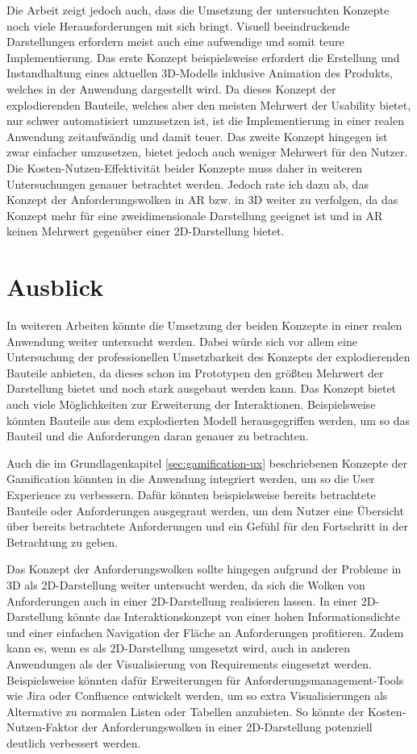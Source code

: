 Die Arbeit zeigt jedoch auch, dass die Umsetzung der untersuchten Konzepte noch viele Herausforderungen mit sich bringt.
Visuell beeindruckende Darstellungen erfordern meist auch eine aufwendige und somit teure Implementierung.
Das erste Konzept beispielsweise erfordert die Erstellung und Instandhaltung eines aktuellen 3D-Modells inklusive Animation des Produkts, welches in der Anwendung dargestellt wird.
Da dieses Konzept der explodierenden Bauteile, welches aber den meisten Mehrwert der Usability bietet, nur schwer automatisiert umzusetzen ist, ist die Implementierung in einer realen Anwendung zeitaufwändig und damit teuer.
Das zweite Konzept hingegen ist zwar einfacher umzusetzen, bietet jedoch auch weniger Mehrwert für den Nutzer.
Die Kosten-Nutzen-Effektivität beider Konzepte muss daher in weiteren Untersuchungen genauer betrachtet werden.
Jedoch rate ich dazu ab, das Konzept der Anforderungswolken in AR bzw. in 3D weiter zu verfolgen, da das Konzept mehr für eine zweidimensionale Darstellung geeignet ist und in AR keinen Mehrwert gegenüber einer 2D-Darstellung bietet.

\section{Ausblick}
\label{section:ausblick}

In weiteren Arbeiten könnte die Umsetzung der beiden Konzepte in einer realen Anwendung weiter untersucht werden.
Dabei würde sich vor allem eine Untersuchung der professionellen Umsetzbarkeit des Konzepts der explodierenden Bauteile anbieten, da dieses schon im Prototypen den größten Mehrwert der Darstellung bietet und noch stark ausgebaut werden kann.
Das Konzept bietet auch viele Möglichkeiten zur Erweiterung der Interaktionen.
Beispielsweise könnten Bauteile aus dem explodierten Modell herausgegriffen werden, um so das Bauteil und die Anforderungen daran genauer zu betrachten.

Auch die im Grundlagenkapitel \ref{sec:gamification-ux} beschriebenen Konzepte der Gamification könnten in die Anwendung integriert werden, um so die User Experience zu verbessern.
Dafür könnten beispielsweise bereits betrachtete Bauteile oder Anforderungen ausgegraut werden, um dem Nutzer eine Übersicht über bereits betrachtete Anforderungen und ein Gefühl für den \glqq{}Fortschritt\grqq{} in der Betrachtung zu geben.

Das Konzept der Anforderungswolken sollte hingegen aufgrund der Probleme in 3D als 2D-Darstellung weiter untersucht werden, da sich die Wolken von Anforderungen auch in einer 2D-Darstellung realisieren lassen.
In einer 2D-Darstellung könnte das Interaktionskonzept von einer hohen Informationsdichte und einer einfachen Navigation der Fläche an Anforderungen profitieren.
Zudem kann es, wenn es als 2D-Darstellung umgesetzt wird, auch in anderen Anwendungen als der Visualisierung von Requirements eingesetzt werden.
Beispielsweise könnten dafür Erweiterungen für Anforderungsmanagement-Tools wie Jira oder Confluence entwickelt werden, um so extra Visualisierungen als Alternative zu normalen Listen oder Tabellen anzubieten.
So könnte der Kosten-Nutzen-Faktor der Anforderungswolken in einer 2D-Darstellung potenziell deutlich verbessert werden.